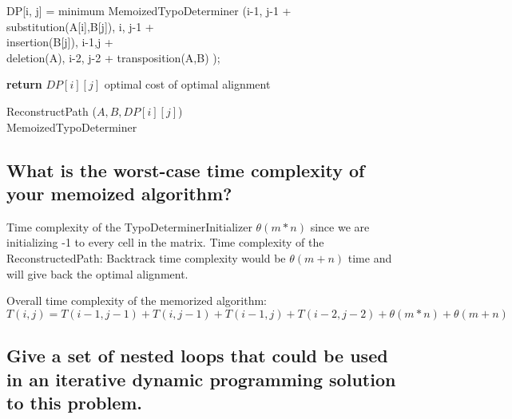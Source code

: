 \documentclass[letterpaper,12pt]{article}
\begin{document}
\IncMargin{1em}
\begin{algorithm}
\BlankLine
{}
{DP[i, j] = minimum MemoizedTypoDeterminer (i-1, j-1 + \\
     substitution(A[i],B[j]), i, j-1  +\\ 
     insertion(B[j]), i-1,j   + \\
     deletion(A), i-2, j-2 + transposition(A,B)   );\newline
    
\textbf{return} {$DP[i][j]$ optimal cost of optimal alignment }}
{ReconstructPath} {($A,B, DP[i][j]$) }\\
\caption{MemoizedTypoDeterminer\label{IR2}}

\end{algorithm}\DecMargin{1em}

\clearpage 
\subsection{What is the worst-case time complexity of your memoized algorithm?}

{Time complexity of the TypoDeterminerInitializer $\theta(m*n)$ since we are initializing -1 to every cell in the matrix.\newline
Time complexity of the ReconstructedPath: Backtrack time complexity would be $\theta(m+n)$ time and will give back the optimal alignment.

Overall time complexity of the memorized algorithm: \newline
$T(i,j)= T(i-1, j-1)+ T(i,j-1)+ T(i-1,j)+ T(i-2,j-2)+ \theta(m*n)+ \theta(m+n)$
}
\newline

\subsection{Give a set of nested loops that could be used in an iterative dynamic programming solution to this problem.}
\end{document}
